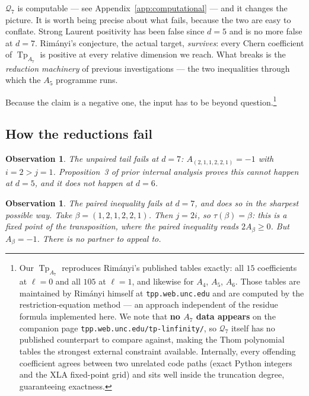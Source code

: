 \documentclass[11pt,a4paper]{article}
\DeclareMathOperator{\Tp}{Tp}
\newcommand{\Qd}{\mathcal{Q}}
\theoremstyle{plain}
\newtheorem{observation}[proposition]{Observation}
\theoremstyle{definition}
\theoremstyle{remark}
\begin{document}
$\Qd_7$ is computable --- see Appendix~\ref{app:computational} --- and it changes the picture.  It is worth
being precise about what fails, because the two are easy to conflate.  Strong Laurent positivity
has been false since $d = 5$ and is no more false at $d = 7$.  Rim\'anyi's conjecture, the actual
target, \emph{survives}: every Chern coefficient of $\Tp_{A_7}$ is positive at every relative
dimension we reach.  What breaks is the \emph{reduction machinery} of previous investigations --- the two inequalities
through which the $A_5$ programme runs.

Because the claim is a negative one, the input has to be beyond question.\footnote{Our $\Tp_{A_7}$ reproduces Rim\'anyi's published tables exactly: all $15$ coefficients at $\ell = 0$ and all $105$ at $\ell = 1$, and likewise for $A_4$, $A_5$, $A_6$.  Those tables are maintained by Rim\'anyi himself at \texttt{tpp.web.unc.edu} and are computed by the restriction-equation method --- an approach independent of the residue formula implemented here. We note that \textbf{no $A_7$ data appears} on the companion page \texttt{tpp.web.unc.edu/tp-linfinity/}, so $\Qd_7$ itself has no published counterpart to compare against, making the Thom polynomial tables the strongest external constraint available. Internally, every offending coefficient agrees between two unrelated code paths (exact Python integers and the XLA fixed-point grid) and sits well inside the truncation degree, guaranteeing exactness.}

\subsection{How the reductions fail}

\begin{observation}
The unpaired tail fails at $d = 7$: $A_{(2,1,1,2,2,1)} = -1$ with $i = 2 > j = 1$.  Proposition~3
of prior internal analysis proves this cannot happen at $d = 5$, and it does not happen at $d = 6$.
\end{observation}

\begin{observation}
The paired inequality fails at $d = 7$, and does so in the sharpest possible way.  Take
$\beta = (1,2,1,2,2,1)$.  Then $j = 2i$, so $\tau(\beta) = \beta$: this is a \emph{fixed point} of
the transposition, where the paired inequality reads $2A_\beta \ge 0$.  But $A_\beta = -1$.  There
is no partner to appeal to.
\end{observation}
\end{document}
